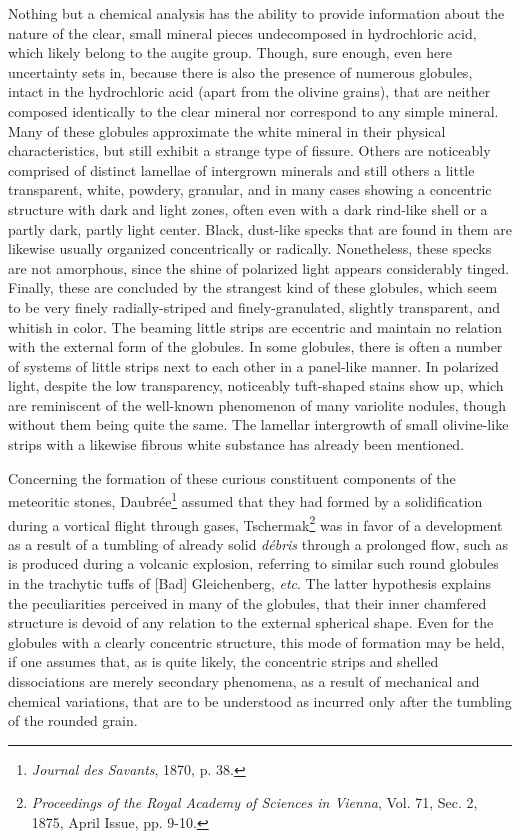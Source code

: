 \documentclass[a4paper, 12pt, oneside]{article}
\begin{document}
Nothing but a chemical analysis has the ability to provide information about the nature of the clear, small mineral pieces undecomposed in hydrochloric acid, which likely belong to the augite group. Though, sure enough, even here uncertainty sets in, because there is also the presence of numerous globules, intact in the hydrochloric acid (apart from the olivine grains), that are neither composed identically to the clear mineral nor correspond to any simple mineral. Many of these globules approximate the white mineral in their physical characteristics, but still exhibit a strange type of fissure. Others are noticeably comprised of distinct lamellae of intergrown minerals and still others a little transparent, white, powdery, granular, and in many cases showing a concentric structure with dark and light zones, often even with a dark rind-like shell or a partly dark, partly light center. Black, dust-like specks that are found in them are likewise usually organized concentrically or radically. Nonetheless, these specks are not amorphous, since the shine of polarized light appears considerably tinged. Finally, these are concluded by the strangest kind of these globules, which seem to be very finely radially-striped and finely-granulated, slightly transparent, and whitish in color. The beaming little strips are eccentric and maintain no relation with the external form of the globules. In some globules, there is often a number of systems of little strips next to each other in a panel-like manner. In polarized light, despite the low transparency, noticeably tuft-shaped stains show up, which are reminiscent of the well-known phenomenon of many variolite nodules, though without them being quite the same. The lamellar intergrowth of small olivine-like strips with a likewise fibrous white substance has already been mentioned.

Concerning the formation of these curious constituent components of the meteoritic stones, Daubrée\footnote{\emph{Journal des Savants}, 1870, p. 38.} assumed that they had formed by a solidification during a vortical flight through gases, Tschermak\footnote{\emph{Proceedings of the Royal Academy of Sciences in Vienna}, Vol. 71, Sec. 2, 1875, April Issue, pp. 9-10.} was in favor of a development as a result of a tumbling of already solid \emph{débris} through a prolonged flow, such as is produced during a volcanic explosion, referring to similar such round globules in the trachytic tuffs of [Bad] Gleichenberg, \emph{etc}. The latter hypothesis explains the peculiarities perceived in many of the globules, that their inner chamfered structure is devoid of any relation to the external spherical shape. Even for the globules with a clearly concentric structure, this mode of formation may be held, if one assumes that, as is quite likely, the concentric strips and shelled dissociations are merely secondary phenomena, as a result of mechanical and chemical variations, that are to be understood as incurred only after the tumbling of the rounded grain.
\end{document}
